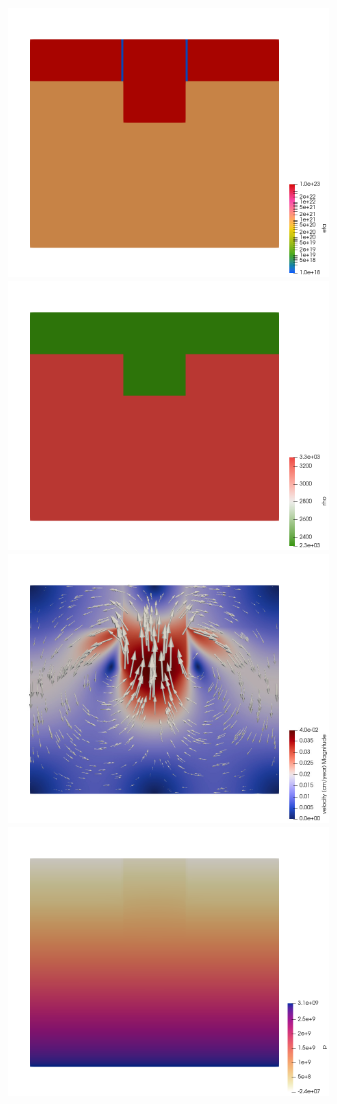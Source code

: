 \begin{center}
\includegraphics[width=8.5cm]{python_codes/fieldstone_160/results/eta.png}
\includegraphics[width=8.5cm]{python_codes/fieldstone_160/results/rho.png}\\
\includegraphics[width=8.5cm]{python_codes/fieldstone_160/results/vel.jpg}
\includegraphics[width=8.5cm]{python_codes/fieldstone_160/results/press.png}\\

\end{center}
